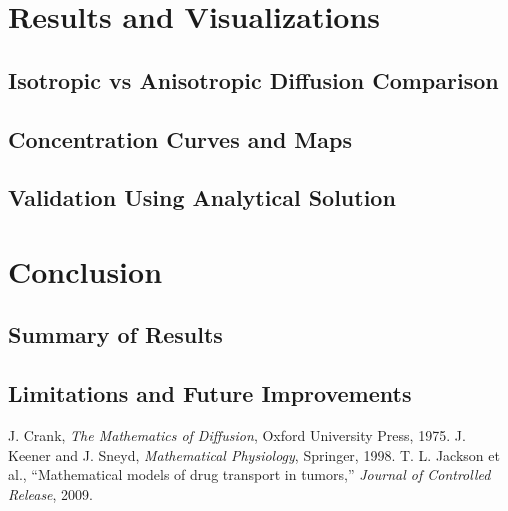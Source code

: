 \documentclass[11pt, a4paper]{article}
\begin{document}
\section{Results and Visualizations}
\subsection{Isotropic vs Anisotropic Diffusion Comparison}
\subsection{Concentration Curves and Maps}
\subsection{Validation Using Analytical Solution}

\section{Conclusion}
\subsection{Summary of Results}
\subsection{Limitations and Future Improvements}

\begin{thebibliography}{9}
 J. Crank, \textit{The Mathematics of Diffusion}, Oxford University Press, 1975.
 J. Keener and J. Sneyd, \textit{Mathematical Physiology}, Springer, 1998.
 T. L. Jackson et al., “Mathematical models of drug transport in tumors,” \textit{Journal of Controlled Release}, 2009.
\end{thebibliography}
\end{document}

